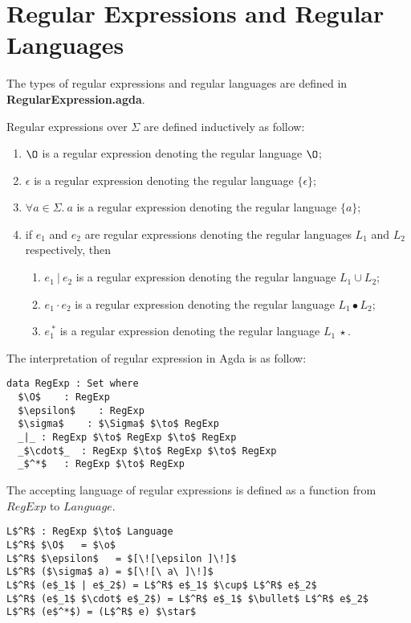 \section{Regular Expressions and Regular Languages}
\par The types of regular expressions and regular languages are defined in
\textbf{RegularExpression.agda}. 

\begin{defn}
\label{defn:regex}
\noindent Regular expressions over \(\Sigma\) are defined inductively as follow: 
\begin{enumerate}[nolistsep]
  \item \(\O\) is a regular expression denoting the regular language \(\O\);
  \item \(\epsilon\) is a regular expression denoting the regular language \(\{\epsilon\}\);
  \item \(\forall a\in\Sigma.\ a\) is a regular expression denoting the regular language \(\{a\}\);
  \item if \(e_{1}\) and \(e_{2}\) are regular expressions denoting the regular
    languages \(L_1\) and \(L_2\) respectively, then
    \begin{enumerate}[nolistsep]
      \item \(e_{1}\ |\ e_{2}\) is a regular expression denoting the
        regular language \(L_1 \cup L_2\);
      \item \(e_{1}\cdot e_{2}\) is a regular expression denoting the
        regular language \(L_1\bullet L_2\);
      \item \(e_{1}^{\ *}\) is a regular expression denoting the regular
        language \(L_1\ \star\).
     \end{enumerate}
\end{enumerate}
\end{defn}

\par The interpretation of regular expression in Agda is as follow:

\begin{lstlisting}[mathescape=true,xleftmargin=.3\textwidth]
data RegExp : Set where
  $\O$    : RegExp
  $\epsilon$    : RegExp
  $\sigma$    : $\Sigma$ $\to$ RegExp
  _|_ : RegExp $\to$ RegExp $\to$ RegExp
  _$\cdot$_  : RegExp $\to$ RegExp $\to$ RegExp
  _$^*$   : RegExp $\to$ RegExp
\end{lstlisting} 

\par The accepting language of regular expressions is defined as
a function from \(RegExp\) to \(Language\). 

\begin{lstlisting}[mathescape=true,xleftmargin=.3\textwidth]
L$^R$ : RegExp $\to$ Language
L$^R$ $\O$   = $\o$
L$^R$ $\epsilon$   = $[\![\epsilon ]\!]$
L$^R$ ($\sigma$ a) = $[\![\ a\ ]\!]$
L$^R$ (e$_1$ | e$_2$) = L$^R$ e$_1$ $\cup$ L$^R$ e$_2$
L$^R$ (e$_1$ $\cdot$ e$_2$) = L$^R$ e$_1$ $\bullet$ L$^R$ e$_2$
L$^R$ (e$^*$) = (L$^R$ e) $\star$
\end{lstlisting} 